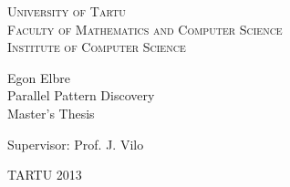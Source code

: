 \begin{titlepage}
\begin{center}

{\scshape
    University of Tartu                  \\[2mm]
    Faculty of Mathematics and Computer Science   \\[3mm]
    Institute of Computer Science
}

  {\Large Egon Elbre } \\[5mm]
  {\Huge  Parallel Pattern Discovery } \\[5mm]
  {\large Master's Thesis}

\begin{flushright}
    {\Large Supervisor: Prof. J. Vilo }
\end{flushright}


{\large TARTU 2013 }

\end{center}
\end{titlepage}
